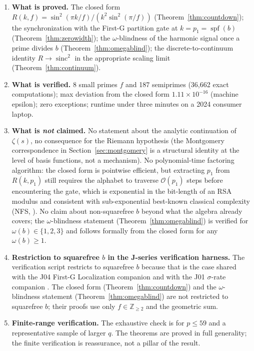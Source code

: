 \documentclass[11pt,reqno]{amsart}
\theoremstyle{plain}
\theoremstyle{definition}
\theoremstyle{remark}
\DeclareMathOperator{\spf}{spf}
\DeclareMathOperator{\sinc}{sinc}
\newcommand{\Z}{\mathbb{Z}}
\newcommand{\bigO}{\mathcal{O}}
\begin{document}
\begin{enumerate}[label={\upshape(\arabic*)}]
\item \textbf{What is proved.} The closed form
      $R(k, f) = \sin^2(\pi k / f) / (k^2 \sin^2(\pi / f))$
      (Theorem~\ref{thm:countdown}); the synchronization with
      the First-G partition gate at $k = p_1 = \spf(b)$
      (Theorem~\ref{thm:zerowidth}); the $\omega$-blindness
      of the harmonic signal once a prime divides $b$
      (Theorem~\ref{thm:omegablind}); the discrete-to-continuum
      identity $R \to \sinc^2$ in the appropriate scaling limit
      (Theorem~\ref{thm:continuum}).

\item \textbf{What is verified.} 8 small primes $f$ and 187
      semiprimes (36{,}662 exact computations); max deviation
      from the closed form $1.11 \times 10^{-16}$ (machine
      epsilon); zero exceptions; runtime under three minutes
      on a 2024 consumer laptop.

\item \textbf{What is \emph{not} claimed.} No statement about the
      analytic continuation of $\zeta(s)$, no consequence for
      the Riemann hypothesis (the Montgomery correspondence in
      Section~\ref{sec:montgomery} is a structural identity at
      the level of basis functions, not a mechanism). No
      polynomial-time factoring algorithm: the closed form is
      pointwise efficient, but extracting $p_1$ from $R(k, p_1)$
      still requires the alphabet to traverse $\bigO(p_1)$ steps
      before encountering the gate, which is exponential in the
      bit-length of an RSA modulus and consistent with
      sub-exponential best-known classical complexity (NFS,
      \cite{LenstraEtAl1993}). No claim about non-squarefree $b$
      beyond what the algebra already covers; the
      $\omega$-blindness statement (Theorem~\ref{thm:omegablind})
      is verified for $\omega(b) \in \{1, 2, 3\}$ and follows
      formally from the closed form for any $\omega(b) \ge 1$.

\item \textbf{Restriction to squarefree $b$ in the J-series
      verification harness.} The verification script restricts
      to squarefree $b$ because that is the case shared with the
      J04 First-G Localization companion \cite{J04Sanders} and
      with the J01 $\sigma$-rate companion \cite{J01Sanders}.
      The closed form (Theorem~\ref{thm:countdown}) and the
      $\omega$-blindness statement (Theorem~\ref{thm:omegablind})
      are not restricted to squarefree $b$; their proofs use
      only $f \in \Z_{\ge 2}$ and the geometric sum.

\item \textbf{Finite-range verification.} The exhaustive check
      is for $p \le 59$ and a representative sample of larger
      $q$. The theorems are proved in full generality; the finite
      verification is reassurance, not a pillar of the result.
\end{enumerate}
\end{document}
